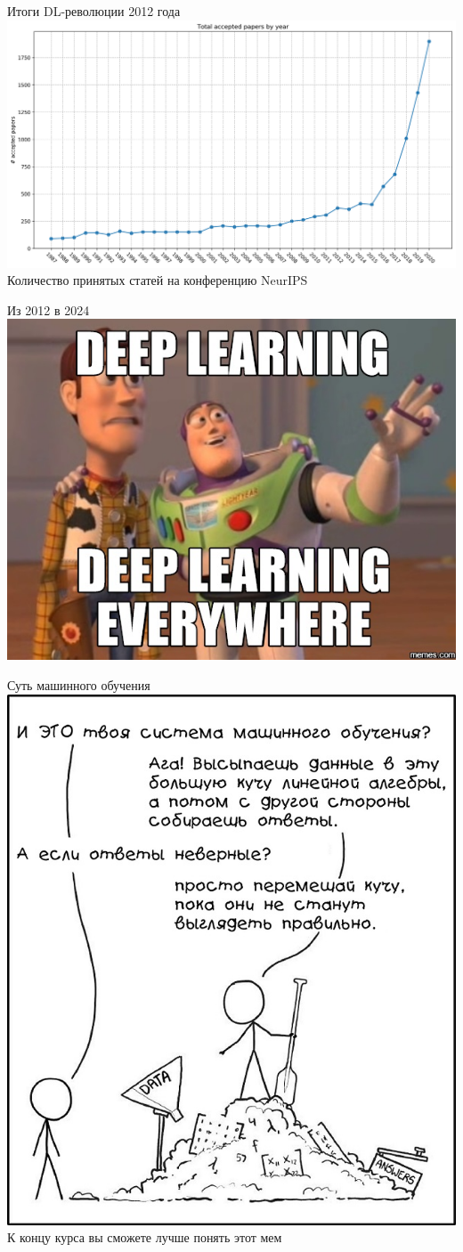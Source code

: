 \documentclass[aspectratio=169, professionalfonts]{beamer}
\begin{document}
\begin{frame}{Итоги DL-революции 2012 года}
    \centering
    \includegraphics[width=.8\linewidth]{figures/fig61-nips.jpg} \\
    Количество принятых статей на конференцию NeurIPS
\end{frame}

\begin{frame}{Из 2012 в 2024}
    \centering
    \includegraphics[width=.6\linewidth]{figures/fig62-dl-everywhere.jpg}
\end{frame}

\begin{frame}{Суть машинного обучения}
    \centering
    \includegraphics[width=.35\linewidth]{figures/fig63-ml-core.jpg} \\
    К концу курса вы сможете лучше понять этот мем
\end{frame}
\end{document}

